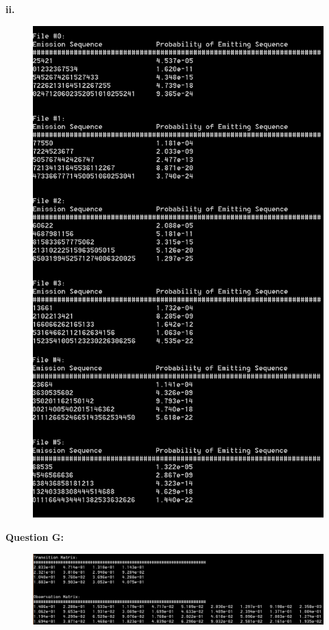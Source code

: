 \documentclass[12 pt]{article}
\begin{document}
	\noindent\textbf{ii.}
	\begin{figure}[H]
	\includegraphics[width=13cm]{2Fii}
	\end{figure} 
	
	\noindent\textbf{Question G:} 
	
	\begin{figure}[H]
		\includegraphics[width=16cm]{2G}
	\end{figure} 
\end{document}
